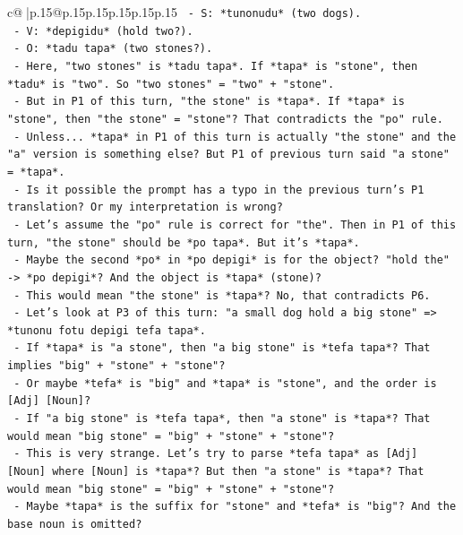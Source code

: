 \documentclass{article}
\begin{document}
{\begin{supertabular}{c@{$\;$}|p{.15\linewidth}@{}p{.15\linewidth}p{.15\linewidth}p{.15\linewidth}p{.15\linewidth}p{.15\linewidth}}
{{{\texttt{              {-} S: *tunonudu* (two dogs).} \\
\texttt{              {-} V: *depigidu* (hold two?).} \\
\texttt{              {-} O: *tadu tapa* (two stones?).} \\
\texttt{              {-} Here, "two stones" is *tadu tapa*. If *tapa* is "stone", then *tadu* is "two". So "two stones" = "two" + "stone".} \\
\texttt{              {-} But in P1 of this turn, "the stone" is *tapa*. If *tapa* is "stone", then "the stone" = "stone"? That contradicts the "po" rule.} \\
\texttt{              {-} Unless... *tapa* in P1 of this turn is actually "the stone" and the "a" version is something else? But P1 of previous turn said "a stone" = *tapa*.} \\
\texttt{              {-} Is it possible the prompt has a typo in the previous turn's P1 translation? Or my interpretation is wrong?} \\
\texttt{              {-} Let's assume the "po" rule is correct for "the". Then in P1 of this turn, "the stone" should be *po tapa*. But it's *tapa*.} \\
\texttt{              {-} Maybe the second *po* in *po depigi* is for the object? "hold the" {-}> *po depigi*? And the object is *tapa* (stone)?} \\
\texttt{              {-} This would mean "the stone" is *tapa*? No, that contradicts P6.} \\
\texttt{              {-} Let's look at P3 of this turn: "a small dog hold a big stone" => *tunonu fotu depigi tefa tapa*.} \\
\texttt{                {-} If *tapa* is "a stone", then "a big stone" is *tefa tapa*? That implies "big" + "stone" + "stone"?} \\
\texttt{                {-} Or maybe *tefa* is "big" and *tapa* is "stone", and the order is {[}Adj{]} {[}Noun{]}?} \\
\texttt{                {-} If "a big stone" is *tefa tapa*, then "a stone" is *tapa*? That would mean "big stone" = "big" + "stone" + "stone"?} \\
\texttt{                {-} This is very strange. Let's try to parse *tefa tapa* as {[}Adj{]} {[}Noun{]} where {[}Noun{]} is *tapa*? But then "a stone" is *tapa*? That would mean "big stone" = "big" + "stone" + "stone"?} \\
\texttt{                {-} Maybe *tapa* is the suffix for "stone" and *tefa* is "big"? And the base noun is omitted?} \\
}}}
\end{supertabular}}
\end{document}
